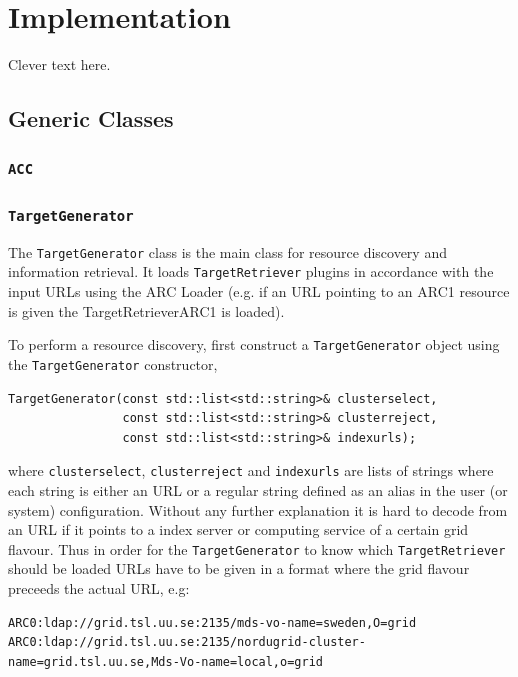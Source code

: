 \documentclass{book}
\newcommand{\ACC}{\texttt{ACC}}
\newcommand{\TargetGenerator}{\texttt{TargetGenerator}}
\newcommand{\TargetRetriever}{\texttt{TargetRetriever}}
\begin{document}
\chapter{Implementation}
\label{sec:Implementation}
Clever text here.
\section{Generic Classes}
\subsection{{\ACC}}

\subsection{{\TargetGenerator}} The {\TargetGenerator} class is the main class for resource discovery and information retrieval. It loads 
{\TargetRetriever} plugins in accordance with the input URLs using the ARC Loader (e.g. if an URL pointing to an ARC1 resource is given 
the TargetRetrieverARC1 is loaded).

To perform a resource discovery, first construct a {\TargetGenerator} object using the {\TargetGenerator} constructor,

\begin{shaded}
\begin{verbatim}
TargetGenerator(const std::list<std::string>& clusterselect,
                const std::list<std::string>& clusterreject,
                const std::list<std::string>& indexurls);
\end{verbatim}
\end{shaded}

where \texttt{clusterselect}, \texttt{clusterreject} and \texttt{indexurls} are lists of strings where each string is either 
an URL or a regular string defined as an alias in the user (or system) configuration. Without any further explanation it is 
hard to decode from an URL if it points to a index server or computing service of a certain grid flavour. Thus in order for 
the {\TargetGenerator} to know which {\TargetRetriever} should be loaded URLs have to be given in a format where the grid 
flavour preceeds the actual URL, e.g:

\begin{shaded}
\begin{small}
\begin{verbatim}
ARC0:ldap://grid.tsl.uu.se:2135/mds-vo-name=sweden,O=grid
ARC0:ldap://grid.tsl.uu.se:2135/nordugrid-cluster-name=grid.tsl.uu.se,Mds-Vo-name=local,o=grid
\end{verbatim}
\end{small}
\end{shaded}
\end{document}

